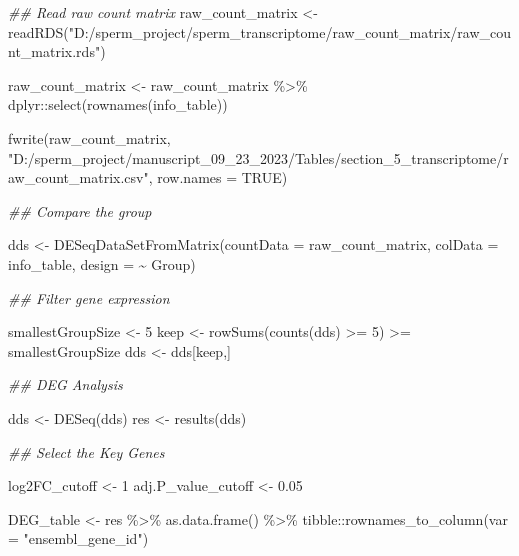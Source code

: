 \documentclass[
  letterpaper,
  DIV=11,
  numbers=noendperiod]{scrreprt}
\newenvironment{Shaded}{\begin{snugshade}}{\end{snugshade}}
\newcommand{\AttributeTok}[1]{\textcolor[rgb]{0.40,0.45,0.13}{#1}}
\newcommand{\ConstantTok}[1]{\textcolor[rgb]{0.56,0.35,0.01}{#1}}
\newcommand{\DecValTok}[1]{\textcolor[rgb]{0.68,0.00,0.00}{#1}}
\newcommand{\DocumentationTok}[1]{\textcolor[rgb]{0.37,0.37,0.37}{\textit{#1}}}
\newcommand{\FloatTok}[1]{\textcolor[rgb]{0.68,0.00,0.00}{#1}}
\newcommand{\FunctionTok}[1]{\textcolor[rgb]{0.28,0.35,0.67}{#1}}
\newcommand{\NormalTok}[1]{\textcolor[rgb]{0.00,0.23,0.31}{#1}}
\newcommand{\OtherTok}[1]{\textcolor[rgb]{0.00,0.23,0.31}{#1}}
\newcommand{\SpecialCharTok}[1]{\textcolor[rgb]{0.37,0.37,0.37}{#1}}
\newcommand{\StringTok}[1]{\textcolor[rgb]{0.13,0.47,0.30}{#1}}
\begin{document}
\begin{codelisting}
\begin{Shaded}
\begin{Highlighting}[]
\DocumentationTok{\#\# Read raw count matrix}
\NormalTok{raw\_count\_matrix }\OtherTok{\textless{}{-}} \FunctionTok{readRDS}\NormalTok{(}\StringTok{"D:/sperm\_project/sperm\_transcriptome/raw\_count\_matrix/raw\_count\_matrix.rds"}\NormalTok{)}

\NormalTok{raw\_count\_matrix }\OtherTok{\textless{}{-}}\NormalTok{ raw\_count\_matrix }\SpecialCharTok{\%\textgreater{}\%}\NormalTok{ dplyr}\SpecialCharTok{::}\FunctionTok{select}\NormalTok{(}\FunctionTok{rownames}\NormalTok{(info\_table))}

\FunctionTok{fwrite}\NormalTok{(raw\_count\_matrix,}
       \StringTok{"D:/sperm\_project/manuscript\_09\_23\_2023/Tables/section\_5\_transcriptome/raw\_count\_matrix.csv"}\NormalTok{, }
       \AttributeTok{row.names =} \ConstantTok{TRUE}\NormalTok{)}


\DocumentationTok{\#\# Compare the group }

\NormalTok{dds }\OtherTok{\textless{}{-}} \FunctionTok{DESeqDataSetFromMatrix}\NormalTok{(}\AttributeTok{countData =}\NormalTok{ raw\_count\_matrix,}
                              \AttributeTok{colData =}\NormalTok{ info\_table,}
                              \AttributeTok{design =} \SpecialCharTok{\textasciitilde{}}\NormalTok{ Group)}

\DocumentationTok{\#\# Filter gene expression}

\NormalTok{smallestGroupSize }\OtherTok{\textless{}{-}} \DecValTok{5}
\NormalTok{keep }\OtherTok{\textless{}{-}} \FunctionTok{rowSums}\NormalTok{(}\FunctionTok{counts}\NormalTok{(dds) }\SpecialCharTok{\textgreater{}=} \DecValTok{5}\NormalTok{) }\SpecialCharTok{\textgreater{}=}\NormalTok{ smallestGroupSize}
\NormalTok{dds }\OtherTok{\textless{}{-}}\NormalTok{ dds[keep,]}


\DocumentationTok{\#\# DEG Analysis}

\NormalTok{dds }\OtherTok{\textless{}{-}} \FunctionTok{DESeq}\NormalTok{(dds)}
\NormalTok{res }\OtherTok{\textless{}{-}} \FunctionTok{results}\NormalTok{(dds)}

\DocumentationTok{\#\# Select the Key Genes}

\NormalTok{log2FC\_cutoff }\OtherTok{\textless{}{-}} \DecValTok{1}
\NormalTok{adj.P\_value\_cutoff }\OtherTok{\textless{}{-}} \FloatTok{0.05}


\NormalTok{DEG\_table }\OtherTok{\textless{}{-}}\NormalTok{ res }\SpecialCharTok{\%\textgreater{}\%} \FunctionTok{as.data.frame}\NormalTok{() }\SpecialCharTok{\%\textgreater{}\%}
\NormalTok{              tibble}\SpecialCharTok{::}\FunctionTok{rownames\_to\_column}\NormalTok{(}\AttributeTok{var =} \StringTok{"ensembl\_gene\_id"}\NormalTok{)}


\end{Highlighting}
\end{Shaded}
\end{codelisting}
\end{document}
